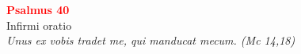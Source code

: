 


\def\greinitialformat#1{%
{\fontsize{39}{39}\selectfont #1}%
}




\vspace{0.3cm}
\begin{center}
 \textcolor{red}{\large \bf Psalmus 40}\\
Infirmi oratio\\
\textit{\small Unus ex vobis tradet me, qui manducat mecum. (Mc 14,18)}
\end{center}

